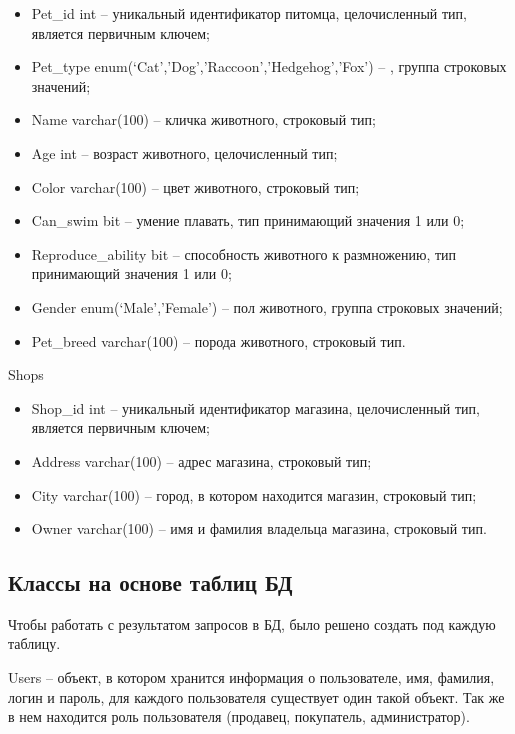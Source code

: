 \begin{itemize}
  \item Pet\_id int – уникальный идентификатор питомца, целочисленный тип, является первичным ключем;
  \item Pet\_type enum(‘Cat’,’Dog’,’Raccoon’,’Hedgehog’,’Fox’) – , группа строковых значений;
  \item Name varchar(100) – кличка животного, строковый тип;
  \item Age int – возраст животного, целочисленный тип;
  \item Color varchar(100) – цвет животного, строковый тип;
  \item Can\_swim bit – умение плавать, тип принимающий значения 1 или 0;
  \item Reproduce\_ability bit – способность животного к размножению, тип принимающий значения 1 или 0;
  \item Gender enum(‘Male’,’Female’) – пол животного, группа строковых значений;
  \item Pet\_breed varchar(100) – порода животного, строковый тип.
\end{itemize}

Shops

\begin{itemize}
  \item Shop\_id int – уникальный идентификатор магазина, целочисленный тип, является первичным ключем;
  \item Address varchar(100) – адрес магазина, строковый тип;
  \item City varchar(100) – город, в котором находится магазин, строковый тип;
  \item Owner varchar(100) – имя и фамилия владельца магазина, строковый тип.
\end{itemize}

\newpage

\subsection{Классы на основе таблиц БД}

\hspace{0.6cm} Чтобы работать с результатом запросов в БД, было решено создать под каждую таблицу.

\hspace{0.6cm} Users – объект, в котором хранится информация о пользователе, имя, фамилия, логин и пароль, для каждого пользователя существует один такой объект. Так же в нем находится роль пользователя (продавец, покупатель, администратор).

